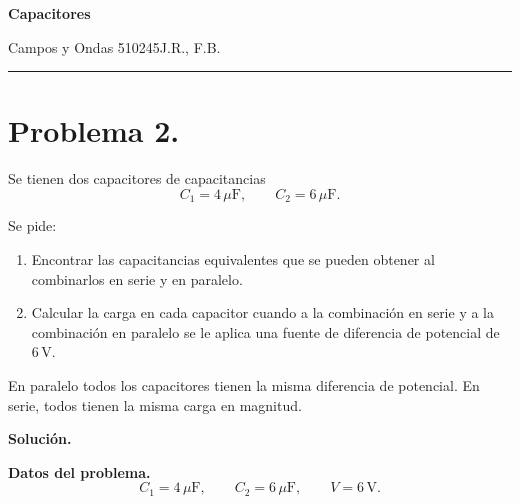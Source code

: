 \documentclass[11pt]{article}
\newcommand{\encabezado}[3]{%
{\Large\bfseries #1\par}
\vspace{2pt}
{\normalsize #2\hfill #3\par}
\vspace{6pt}\hrule\vspace{8pt}}
\newcommand{\soluciontitulo}{%
  \par\medskip
  \noindent\textbf{Solución.}\par
  \smallskip
}
\begin{document}
\encabezado{Capacitores}{Campos y Ondas 510245}{J.R., F.B.}
\shorthandoff{<>}


\section*{Problema 2.}
Se tienen dos capacitores de capacitancias
\begin{equation*}
    C_1=4\,\mu\text{F},
    \qquad
    C_2=6\,\mu\text{F}.
\end{equation*}

Se pide:
\begin{enumerate}[label=(\alph*)]
    \item Encontrar las capacitancias equivalentes que se pueden obtener al combinarlos en serie y en paralelo.
    \item Calcular la carga en cada capacitor cuando a la combinaci\'on en serie y a la combinaci\'on en paralelo se le aplica una fuente de diferencia de potencial de $6\,\text{V}$.
\end{enumerate}

\par\medskip\noindent En paralelo todos los capacitores tienen la misma diferencia de potencial. En serie, todos tienen la misma carga en magnitud.\par\medskip 


\soluciontitulo

\textbf{Datos del problema.}
\begin{equation*}
    C_1=4\,\mu\text{F},
    \qquad
    C_2=6\,\mu\text{F},
    \qquad
    V=6\,\text{V}.
\end{equation*}
\end{document}
